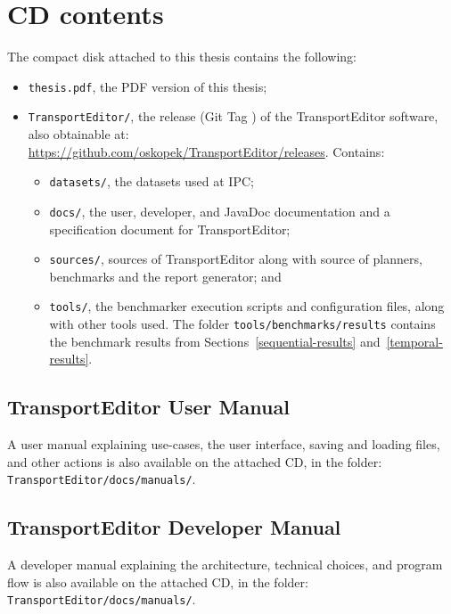 
\section*{CD contents}\label{cd-contents}

The compact disk attached to this thesis contains the following:

\begin{itemize}
\item \verb+thesis.pdf+, the PDF version of this thesis;
\item \verb+TransportEditor/+, the \TEver{} release (Git Tag \TEtag{}) of the TransportEditor software, also obtainable at:\\
\url{https://github.com/oskopek/TransportEditor/releases}. Contains:
\begin{itemize}
\item \verb+datasets/+, the datasets used at IPC;
\item \verb+docs/+, the user, developer, and JavaDoc documentation and a specification document for TransportEditor;
\item \verb+sources/+, sources of TransportEditor along with source of planners, benchmarks and the report generator; and
\item \verb+tools/+, the benchmarker execution scripts and configuration files, along with other tools used. The folder \verb+tools/benchmarks/results+ contains the benchmark results
from Sections~\ref{sequential-results} and~\ref{temporal-results}.
\end{itemize}
\end{itemize}

\subsection*{TransportEditor User Manual}\label{transporteditor-user-manual}

A user manual explaining use-cases, the user interface, saving and loading files,
and other actions is also available on the attached CD, in the folder:\\
\verb+TransportEditor/docs/manuals/+.

\subsection*{TransportEditor Developer Manual}\label{transporteditor-developer-manual}

A developer manual explaining the architecture, technical choices, and program flow
is also available on the attached CD, in the folder:\\
\verb+TransportEditor/docs/manuals/+.

